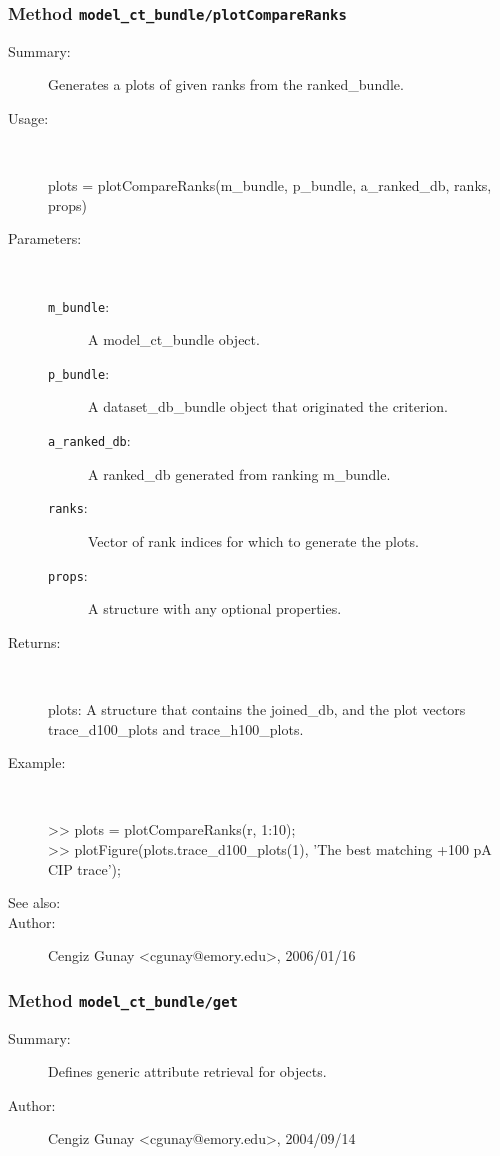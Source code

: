 \subsubsection[Method \texttt{plotCompareRanks}]{Method \texttt{model\_ct\_bundle/plotCompareRanks}}%
%
\label{ref_model_ct_bundle__plotCompareRanks}%
\hypertarget{ref_model_ct_bundle__plotCompareRanks}{}%
\begin{description}
\item[Summary:]Generates a plots of given ranks from the ranked\_bundle.
%
\item[Usage:]~%
\begin{lyxcode}%
plots = plotCompareRanks(m\_bundle, p\_bundle, a\_ranked\_db, ranks, props)
%
\end{lyxcode}%
%
%
\item[Parameters:]~
\begin{description}%
\item[\texttt{m\_bundle}:]
 A model\_ct\_bundle object.
\item[\texttt{p\_bundle}:]
 A dataset\_db\_bundle object that originated the criterion.
\item[\texttt{a\_ranked\_db}:]
 A ranked\_db generated from ranking m\_bundle.
\item[\texttt{ranks}:]
 Vector of rank indices for which to generate the plots.
\item[\texttt{props}:]
 A structure with any optional properties.
\end{description}%
%
\item[Returns:]~

	plots: A structure that contains the joined\_db, and the plot vectors 
	  trace\_d100\_plots and trace\_h100\_plots.
%
\item[Example:]~
\begin{lyxcode} >> plots = plotCompareRanks(r, 1:10);\\%
 >> plotFigure(plots.trace\_d100\_plots(1), 'The best matching +100 pA CIP trace');\\%
\end{lyxcode}
%
\item[See also:]%
%
\item[Author:]%
Cengiz Gunay <cgunay@emory.edu>, 2006/01/16%
\end{description}
\methodline%
\subsubsection[Method \texttt{get}]{Method \texttt{model\_ct\_bundle/get}}%
%
\label{ref_model_ct_bundle__get}%
\hypertarget{ref_model_ct_bundle__get}{}%
\begin{description}
\item[Summary:]Defines generic attribute retrieval for objects.
%
%
%
%
%
%
%
\item[Author:]%
Cengiz Gunay <cgunay@emory.edu>, 2004/09/14%
\end{description}
\methodline%
